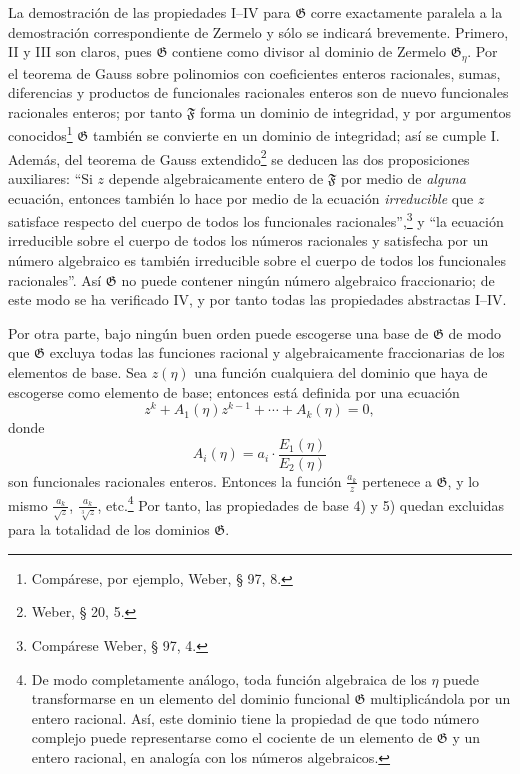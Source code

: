 \documentclass[11pt]{article}
\begin{document}
La demostración de las propiedades I--IV para $\mathfrak G$ corre exactamente paralela a la demostración correspondiente de Zermelo y sólo se indicará brevemente. Primero, II y III son claros, pues $\mathfrak G$ contiene como divisor al dominio de Zermelo $\mathfrak G_\eta$. Por el teorema de Gauss sobre polinomios con coeficientes enteros racionales, sumas, diferencias y productos de funcionales racionales enteros son de nuevo funcionales racionales enteros; por tanto $\mathfrak F$ forma un dominio de integridad, y por argumentos conocidos\footnote{Compárese, por ejemplo, Weber, § 97, 8.} $\mathfrak G$ también se convierte en un dominio de integridad; así se cumple I. Además, del teorema de Gauss extendido\footnote{Weber, § 20, 5.} se deducen las dos proposiciones auxiliares: ``Si $z$ depende algebraicamente entero de $\mathfrak F$ por medio de \emph{alguna} ecuación, entonces también lo hace por medio de la ecuación \emph{irreducible} que $z$ satisface respecto del cuerpo de todos los funcionales racionales'',\footnote{Compárese Weber, § 97, 4.} y ``la ecuación irreducible sobre el cuerpo de todos los números racionales y satisfecha por un número algebraico es también irreducible sobre el cuerpo de todos los funcionales racionales''. Así $\mathfrak G$ no puede contener ningún número algebraico fraccionario; de este modo se ha verificado IV, y por tanto todas las propiedades abstractas I--IV.

Por otra parte, bajo ningún buen orden puede escogerse una base de $\mathfrak G$ de modo que $\mathfrak G$ excluya todas las funciones racional y algebraicamente fraccionarias de los elementos de base. Sea $z(\eta)$ una función cualquiera del dominio que haya de escogerse como elemento de base; entonces está definida por una ecuación
\[
 z^k+A_1(\eta)z^{k-1}+\cdots+A_k(\eta)=0,
\]
donde
\[
 A_i(\eta)=a_i\cdot\frac{E_1(\eta)}{E_2(\eta)}
\]
son funcionales racionales enteros. Entonces la función $\frac{a_k}{z}$ pertenece a $\mathfrak G$, y lo mismo $\frac{a_k}{\sqrt z}$, $\frac{a_k}{\sqrt[3]z}$, etc.\footnote{De modo completamente análogo, toda función algebraica de los $\eta$ puede transformarse en un elemento del dominio funcional $\mathfrak G$ multiplicándola por un entero racional. Así, este dominio tiene la propiedad de que todo número complejo puede representarse como el cociente de un elemento de $\mathfrak G$ y un entero racional, en analogía con los números algebraicos.} Por tanto, las propiedades de base 4) y 5) quedan excluidas para la totalidad de los dominios $\mathfrak G$.
\end{document}
